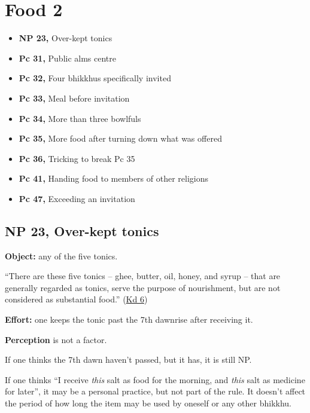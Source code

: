 \chapter{Food 2}

\begin{itemize}
\tightlist
\item
  \textbf{NP 23,} Over-kept tonics
\item
  \textbf{Pc 31,} Public alms centre
\item
  \textbf{Pc 32,} Four bhikkhus specifically invited
\item
  \textbf{Pc 33,} Meal before invitation
\item
  \textbf{Pc 34,} More than three bowlfuls
\item
  \textbf{Pc 35,} More food after turning down what was offered
\item
  \textbf{Pc 36,} Tricking to break Pc 35
\item
  \textbf{Pc 41,} Handing food to members of other religions
\item
  \textbf{Pc 47,} Exceeding an invitation
\end{itemize}

\section{NP 23, Over-kept tonics}


\begin{multicols}{2}

\textbf{Object:} any of the five tonics.

``There are these five tonics -- ghee, butter, oil, honey, and syrup --
that are generally regarded as tonics, serve the purpose of nourishment,
but are not considered as substantial food.''
(\href{https://suttacentral.net/pli-tv-kd6/en/brahmali}{Kd 6})

\textbf{Effort:} one keeps the tonic past the 7th dawnrise after
receiving it.

\textbf{Perception} is not a factor.

If one thinks the 7th dawn haven't passed, but it has, it is still NP.

If one thinks ``I receive \emph{this} salt as food for the morning, and
\emph{this} salt as medicine for later'', it may be a personal practice,
but not part of the rule. It doesn't affect the period of how long the
item may be used by oneself or any other bhikkhu.

\end{multicols}

